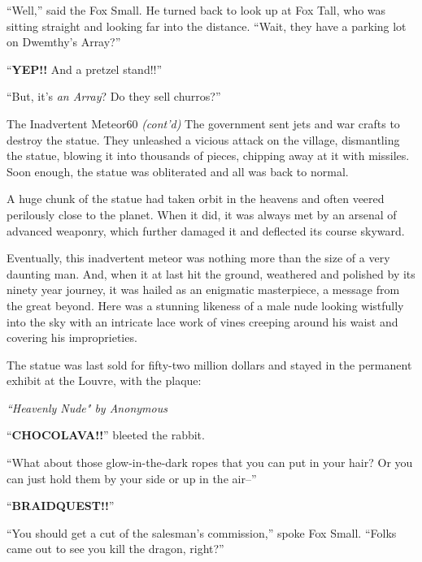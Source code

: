 \documentclass[10pt,twoside]{report}
\begin{document}
``Well,'' said the Fox Small.  He turned back to look up at Fox Tall,
        who was sitting straight and looking far into the distance.
        ``Wait, they have a parking lot on Dwemthy's Array?''

``{\bf YEP!!}  And a pretzel stand!!''

``But, it's {\em an Array}?  Do they sell churros?''

	\begin{sidebar}{The Inadvertent Meteor}{60}
		\textit{(cont'd)} The government sent jets and war crafts to destroy the statue. They unleashed a vicious attack on the village, dismantling the statue, blowing it into thousands of pieces, chipping away at it with missiles. Soon enough, the statue was obliterated and all was back to normal.\vspace{6pt}
		
		A huge chunk of the statue had taken orbit in the heavens and often veered perilously close to the planet. When it did, it was always met by an arsenal of advanced weaponry, which further damaged it and deflected its course skyward.\vspace{6pt}

		Eventually, this inadvertent meteor was nothing more than the size of a very daunting man. And, when it at last hit the ground, weathered and polished by its ninety year journey, it was hailed as an enigmatic masterpiece, a message from the great beyond. Here was a stunning likeness of a male nude looking wistfully into the sky with an intricate lace work of vines creeping around his waist and covering his improprieties.\vspace{6pt}

		The statue was last sold for fifty-two million dollars and stayed in the permanent exhibit at the Louvre, with the plaque:\vspace{6pt}
		
		\indent \textit{``Heavenly Nude" by Anonymous}
	\end{sidebar}

``{\bf CHOCOLAVA!!}'' bleeted the rabbit.

``What about those glow-in-the-dark ropes that you can put in your
        hair?  Or you can just hold them by your side or up in the
        air--''

``{\bf BRAIDQUEST!!}''

``You should get a cut of the salesman's commission,'' spoke Fox
        Small.  ``Folks came out to see you kill the dragon, right?''
\end{document}
